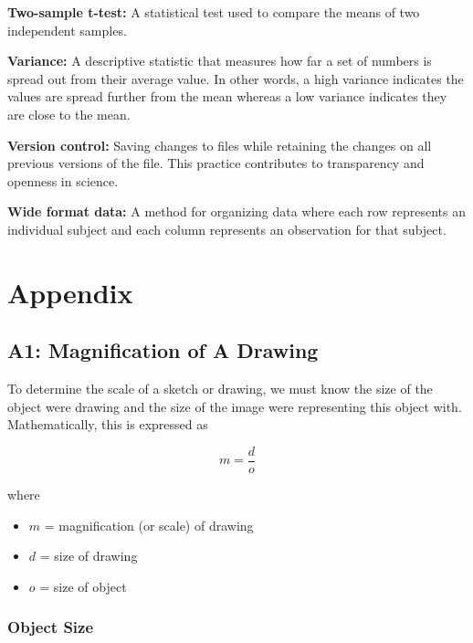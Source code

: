 \documentclass[
]{book}
\providecommand{\tightlist}{%
  \setlength{\itemsep}{0pt}\setlength{\parskip}{0pt}}
\begin{document}
\textbf{Two-sample t-test:} A statistical test used to compare the means of two independent samples.

\textbf{Variance:} A descriptive statistic that measures how far a set of numbers is spread out from their average value. In other words, a high variance indicates the values are spread further from the mean whereas a low variance indicates they are close to the mean.

\textbf{Version control:} Saving changes to files while retaining the changes on all previous versions of the file. This practice contributes to transparency and openness in science.

\textbf{Wide format data:} A method for organizing data where each row represents an individual subject and each column represents an observation for that subject.

\hypertarget{part-appendix}{%
\part*{Appendix}\label{part-appendix}}

\hypertarget{a1-magnification-of-a-drawing}{%
\chapter*{A1: Magnification of A Drawing}\label{a1-magnification-of-a-drawing}}

To determine the scale of a sketch or drawing, we must know the size of the object we\textquotesingle re drawing and the size of the image we\textquotesingle re representing this object with. Mathematically, this is expressed as

\[m = \frac{d}{o}\]

where

\begin{itemize}
\tightlist
\item
  \(m\) = magnification (or scale) of drawing
\item
  \(d\) = size of drawing
\item
  \(o\) = size of object
\end{itemize}

\hypertarget{object-size}{%
\section{Object Size}\label{object-size}}
\end{document}
